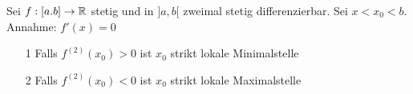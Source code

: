  Sei \(f : [a.b] \rightarrow \mathbb{R} \) stetig und in \(]a,b[\) zweimal stetig differenzierbar. Sei \(x < x_0 < b\). Annahme: \(f'(x) = 0\)
\begin{enumerate}
    \item [1] Falls \(f^{(2)}(x_0) > 0\) ist \(x_0\) strikt lokale Minimalstelle
    \item [2] Falls \(f^{(2)}(x_0) < 0\) ist \(x_0\) strikt lokale Maximalstelle
\end{enumerate}